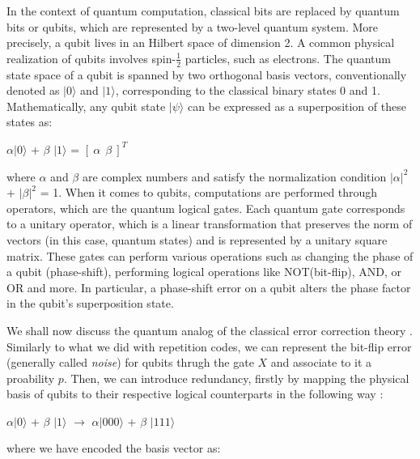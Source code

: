 \documentclass{Configuration_Files/PoliMi3i_thesis}
\begin{document}
In the context of quantum computation, classical bits are replaced by quantum bits or qubits, which are represented by a two-level quantum system. More precisely, a qubit lives in an Hilbert space of dimension 2. A common physical realization of qubits involves spin-$\frac{1}{2}$ particles, such as electrons. The quantum state space of a qubit is spanned by two orthogonal basis vectors, conventionally denoted as $ |0 \rangle$ and $ |1 \rangle$, corresponding to the classical binary states 0 and 1. Mathematically, any qubit state 
$ |\psi \rangle$ can be expressed as a superposition of these states as:


\begin{center}
	$\alpha |0 \rangle$ + $\beta$ $|1 \rangle$ =  $[ \ \alpha \ \ \beta \ ]^T $
\end{center}

where $\alpha$ and $\beta$ are complex numbers and satisfy the normalization condition $|\alpha|^2$ + $|\beta|^2$ = 1. \newline
When it comes to qubits, computations are performed through operators, which are the quantum logical gates. Each quantum gate corresponds to a unitary operator, which is a linear transformation that preserves the norm of vectors (in this case, quantum states) and is represented by a unitary square matrix. These gates can perform various operations such as changing the phase of a qubit (phase-shift), performing logical operations like NOT(bit-flip), AND, or OR and more. In particular, a phase-shift error on a qubit alters the phase factor in the qubit's superposition state. \newline

We shall now discuss the quantum analog of the classical error correction theory \cite{Cha06}. \newline
Similarly to what we did with repetition codes, we can represent the bit-flip error (generally called {\it noise}) for qubits thrugh the gate $X$ and associate to it a proability $p$. \newline
Then, we can introduce redundancy, firstly by mapping the physical basis of qubits to their respective logical counterparts in the following way \cite{Nie06}:

\begin{center}
	$\alpha |0 \rangle$ + $\beta$ $|1 \rangle$ $\rightarrow$ $\alpha |000 \rangle$ + $\beta$ $|111 \rangle$
\end{center}

where we have encoded the basis vector as:
\end{document}
